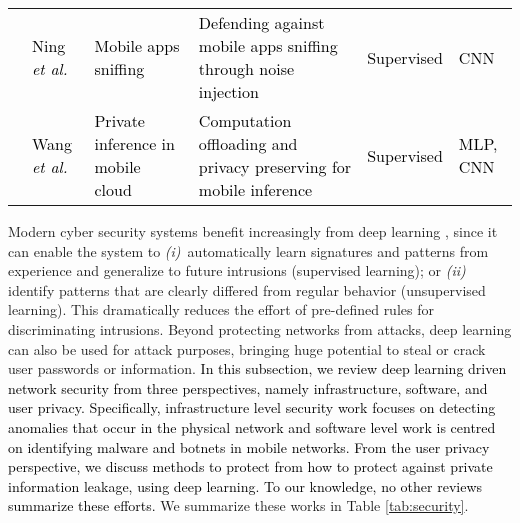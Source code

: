 \documentclass[journal,comsoc,letter]{IEEEtran}
\newcommand{\edit}[1]{\textcolor{black}{#1}}
\newcommand{\rev}[1]{\textcolor{black}{#1}}
\begin{document}
\begin{table*}[h!]
\begin{tabular}{|c|C{2.1cm}|C{3.3cm}|C{6cm}|C{1.7cm}|C{1.7cm}|}
                                      & \rev{Ning \emph{et al.} \cite{ning2018deepmag}}             & \rev{Mobile apps sniffing}                                          & \rev{Defending against mobile apps sniffing through noise injection}                                                                                 & \rev{Supervised}          & \rev{CNN}                                                \\  
                                      & \rev{Wang \emph{et al.} \cite{wang2018not}}             & \rev{Private inference in mobile cloud}                                          & \rev{Computation offloading and privacy preserving for mobile inference}                                                                                 & \rev{Supervised}          & \rev{MLP, CNN}                                                \\ \hline
\end{tabular}
\end{table*}

Modern cyber security systems benefit increasingly from deep learning \cite{kwon2017survey}, since it can enable the system to \emph{(i)}~automatically learn signatures and patterns from experience and generalize to future intrusions (supervised learning); or \emph{(ii)} identify patterns that are clearly differed from regular behavior (unsupervised learning). This dramatically reduces the effort of pre-defined rules for discriminating intrusions. Beyond protecting networks from attacks,  deep learning can also be used for attack purposes, bringing huge potential to steal or crack user passwords or information. \edit{In this subsection, we review deep learning driven network security from three perspectives, namely infrastructure, software, and user privacy. Specifically, infrastructure level security work focuses on detecting anomalies that occur in the physical network and software level work is centred on identifying malware and botnets in mobile networks. From the user privacy perspective, we discuss methods to protect from how to protect against private information leakage, using deep learning. To our knowledge, no other reviews summarize these efforts.} We summarize these works in Table \ref{tab:security}. \\
\end{document}
